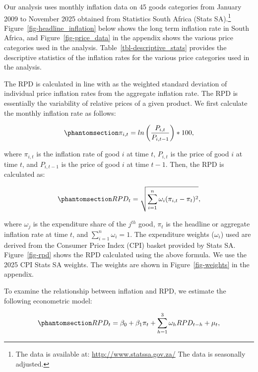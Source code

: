 \documentclass[
  letterpaper,
  DIV=11,
  numbers=noendperiod]{scrartcl}
\begin{document}
Our analysis uses monthly inflation data on 45 goods categories from
January 2009 to November 2025 obtained from Statistics South Africa
(Stats SA).\footnote{The data is available at:
  \url{http://www.statssa.gov.za/} The data is seasonally adjusted.}
Figure~\ref{fig-headline_inflation} below shows the long term inflation
rate in South Africa, and Figure~\ref{fig-price_data} in the appendix
shows the various price categories used in the analysis.
Table~\ref{tbl-descriptive_stats} provides the descriptive statistics of
the inflation rates for the various price categories used in the
analysis.

The RPD is calculated in line with \citet{lach1992} as the weighted
standard deviation of individual price inflation rates from the
aggregate inflation rate. The RPD is essentially the variability of
relative prices of a given product. We first calculate the monthly
inflation rate as follows:

\begin{equation}\phantomsection\label{eq-inflation_rate}{ \pi_{i,t} = ln\left(\frac{P_{i,t}}{P_{i,t-1}}\right) * 100, }\end{equation}

where \(\pi_{i,t}\) is the inflation rate of good \(i\) at time \(t\),
\(P_{i,t}\) is the price of good \(i\) at time \(t\), and \(P_{i,t-1}\)
is the price of good \(i\) at time \(t-1\). Then, the RPD is calculated
as:

\begin{equation}\phantomsection\label{eq-rpd}{RPD_{t} = \sqrt{\sum_{i=1}^{n}\omega_{i}(\pi_{i,t} - \pi_{t})^2}, }\end{equation}

where \(\omega_{j}\) is the expenditure share of the \(j^{th}\) good,
\(\pi_{t}\) is the headline or aggregate inflation rate at time \(t\),
and \(\sum_{i=1}^{n}\omega_{i} = 1\). The expenditure weights
(\(\omega_{i}\)) used are derived from the Consumer Price Index (CPI)
basket provided by Stats SA. Figure~\ref{fig-rpd} shows the RPD
calculated using the above formula. We use the 2025 CPI Stats SA
weights. The weights are shown in Figure~\ref{fig-weights} in the
appendix.

To examine the relationship between inflation and RPD, we estimate the
following econometric model:

\begin{equation}\phantomsection\label{eq-rpd_reg}{RPD_{t} = \beta_0 + \beta_1\pi_{t} + \sum_{h=1}^{3}\omega_hRPD_{t-h}  +  \mu_{t}, }\end{equation}
\end{document}
